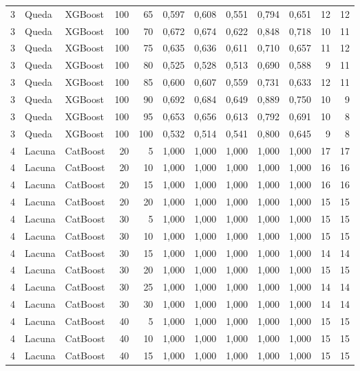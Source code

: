 \begin{longtable}{@{}rllrrrrrrrrr@{}}
3 & Queda & XGBoost & 100 & 65 & 0,597 & 0,608 & 0,551 & 0,794 & 0,651 & 12 & 12 \\
3 & Queda & XGBoost & 100 & 70 & 0,672 & 0,674 & 0,622 & 0,848 & 0,718 & 10 & 11 \\
3 & Queda & XGBoost & 100 & 75 & 0,635 & 0,636 & 0,611 & 0,710 & 0,657 & 11 & 12 \\
3 & Queda & XGBoost & 100 & 80 & 0,525 & 0,528 & 0,513 & 0,690 & 0,588 & 9 & 11 \\
3 & Queda & XGBoost & 100 & 85 & 0,600 & 0,607 & 0,559 & 0,731 & 0,633 & 12 & 11 \\
3 & Queda & XGBoost & 100 & 90 & 0,692 & 0,684 & 0,649 & 0,889 & 0,750 & 10 & 9 \\
3 & Queda & XGBoost & 100 & 95 & 0,653 & 0,656 & 0,613 & 0,792 & 0,691 & 10 & 8 \\
3 & Queda & XGBoost & 100 & 100 & 0,532 & 0,514 & 0,541 & 0,800 & 0,645 & 9 & 8 \\
4 & Lacuna & CatBoost & 20 & 5 & 1,000 & 1,000 & 1,000 & 1,000 & 1,000 & 17 & 17 \\
4 & Lacuna & CatBoost & 20 & 10 & 1,000 & 1,000 & 1,000 & 1,000 & 1,000 & 16 & 16 \\
4 & Lacuna & CatBoost & 20 & 15 & 1,000 & 1,000 & 1,000 & 1,000 & 1,000 & 16 & 16 \\
4 & Lacuna & CatBoost & 20 & 20 & 1,000 & 1,000 & 1,000 & 1,000 & 1,000 & 15 & 15 \\
4 & Lacuna & CatBoost & 30 & 5 & 1,000 & 1,000 & 1,000 & 1,000 & 1,000 & 15 & 15 \\
4 & Lacuna & CatBoost & 30 & 10 & 1,000 & 1,000 & 1,000 & 1,000 & 1,000 & 15 & 15 \\
4 & Lacuna & CatBoost & 30 & 15 & 1,000 & 1,000 & 1,000 & 1,000 & 1,000 & 14 & 14 \\
4 & Lacuna & CatBoost & 30 & 20 & 1,000 & 1,000 & 1,000 & 1,000 & 1,000 & 15 & 15 \\
4 & Lacuna & CatBoost & 30 & 25 & 1,000 & 1,000 & 1,000 & 1,000 & 1,000 & 14 & 14 \\
4 & Lacuna & CatBoost & 30 & 30 & 1,000 & 1,000 & 1,000 & 1,000 & 1,000 & 14 & 14 \\
4 & Lacuna & CatBoost & 40 & 5 & 1,000 & 1,000 & 1,000 & 1,000 & 1,000 & 15 & 15 \\
4 & Lacuna & CatBoost & 40 & 10 & 1,000 & 1,000 & 1,000 & 1,000 & 1,000 & 15 & 15 \\
4 & Lacuna & CatBoost & 40 & 15 & 1,000 & 1,000 & 1,000 & 1,000 & 1,000 & 15 & 15 \\

\end{longtable}
